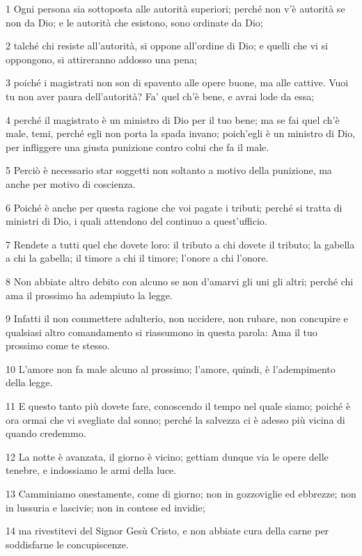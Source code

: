 \par 1 Ogni persona sia sottoposta alle autorità superiori; perché non v'è autorità se non da Dio; e le autorità che esistono, sono ordinate da Dio;
\par 2 talché chi resiste all'autorità, si oppone all'ordine di Dio; e quelli che vi si oppongono, si attireranno addosso una pena;
\par 3 poiché i magistrati non son di spavento alle opere buone, ma alle cattive. Vuoi tu non aver paura dell'autorità? Fa' quel ch'è bene, e avrai lode da essa;
\par 4 perché il magistrato è un ministro di Dio per il tuo bene; ma se fai quel ch'è male, temi, perché egli non porta la spada invano; poich'egli è un ministro di Dio, per infliggere una giusta punizione contro colui che fa il male.
\par 5 Perciò è necessario star soggetti non soltanto a motivo della punizione, ma anche per motivo di coscienza.
\par 6 Poiché è anche per questa ragione che voi pagate i tributi; perché si tratta di ministri di Dio, i quali attendono del continuo a quest'ufficio.
\par 7 Rendete a tutti quel che dovete loro: il tributo a chi dovete il tributo; la gabella a chi la gabella; il timore a chi il timore; l'onore a chi l'onore.
\par 8 Non abbiate altro debito con alcuno se non d'amarvi gli uni gli altri; perché chi ama il prossimo ha adempiuto la legge.
\par 9 Infatti il non commettere adulterio, non uccidere, non rubare, non concupire e qualsiasi altro comandamento si riassumono in questa parola: Ama il tuo prossimo come te stesso.
\par 10 L'amore non fa male alcuno al prossimo; l'amore, quindi, è l'adempimento della legge.
\par 11 E questo tanto più dovete fare, conoscendo il tempo nel quale siamo; poiché è ora ormai che vi svegliate dal sonno; perché la salvezza ci è adesso più vicina di quando credemmo.
\par 12 La notte è avanzata, il giorno è vicino; gettiam dunque via le opere delle tenebre, e indossiamo le armi della luce.
\par 13 Camminiamo onestamente, come di giorno; non in gozzoviglie ed ebbrezze; non in lussuria e lascivie; non in contese ed invidie;
\par 14 ma rivestitevi del Signor Gesù Cristo, e non abbiate cura della carne per soddisfarne le concupiscenze.

